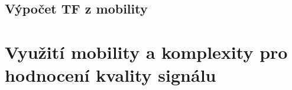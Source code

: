 \subsection*{Výpočet TF z mobility}
\label{sec:TF_mobilita}


\section{Využití mobility a komplexity pro hodnocení kvality signálu}
\label{sec:hjorth_kvalita}
